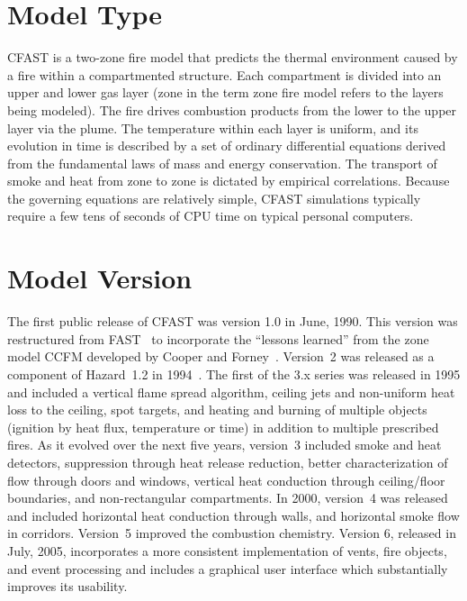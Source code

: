 \documentclass[12pt,twoside]{book}
\begin{document}
\section{Model Type}

CFAST is a two-zone fire model that predicts the thermal environment caused by a fire within a compartmented structure. Each compartment is divided into an upper and lower gas layer (zone in the term zone fire model refers to the layers being modeled). The fire drives combustion products from the lower to the upper layer via the plume. The temperature within each layer is uniform, and its evolution in time is described by a set of ordinary differential equations derived from the fundamental laws of mass and energy conservation. The transport of smoke and heat from zone to zone is dictated by empirical correlations. Because the governing equations are relatively simple, CFAST simulations typically require a few tens of seconds of CPU time on typical personal computers.


\section{Model Version}

The first public release of CFAST was version 1.0 in June, 1990. This version was restructured from FAST~\cite{Models:FAST} to incorporate the ``lessons learned'' from the zone model CCFM developed by Cooper and Forney~\cite{Models:CCFM}. Version~2 was released as a component of Hazard~1.2 in 1994~\cite{Models:HAZARDI, Models:HAZARDI_12}. The first of the 3.x series was released in 1995 and included a vertical flame spread algorithm, ceiling jets and non-uniform heat loss to the ceiling, spot targets, and heating and burning of multiple objects (ignition by heat flux, temperature or time) in addition to multiple prescribed fires. As it evolved over the next five years, version~3 included smoke and heat detectors, suppression through heat release reduction, better characterization of flow through doors and windows, vertical heat conduction through ceiling/floor boundaries, and non-rectangular compartments. In 2000, version~4 was released and included horizontal heat conduction through walls, and horizontal smoke flow in corridors. Version~5 improved the combustion chemistry. Version 6, released in July, 2005, incorporates a more consistent implementation of vents, fire objects, and event processing and includes a graphical user interface which substantially improves its usability.
\end{document}
